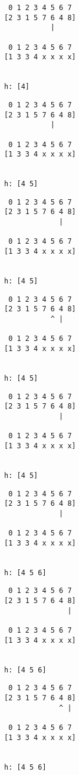{ \begin{verbatim}
 0 1 2 3 4 5 6 7
[2 3 1 5 7 6 4 8]
           |

 0 1 2 3 4 5 6 7
[1 3 3 4 x x x x]


h: [4]
\end{verbatim} }

{ \begin{verbatim}
 0 1 2 3 4 5 6 7
[2 3 1 5 7 6 4 8]
           |

 0 1 2 3 4 5 6 7
[1 3 3 4 x x x x]


h: [4 5]
\end{verbatim} }

{ \begin{verbatim}
 0 1 2 3 4 5 6 7
[2 3 1 5 7 6 4 8]
             |

 0 1 2 3 4 5 6 7
[1 3 3 4 x x x x]


h: [4 5]
\end{verbatim} }

{ \begin{verbatim}
 0 1 2 3 4 5 6 7
[2 3 1 5 7 6 4 8]
           ^ |

 0 1 2 3 4 5 6 7
[1 3 3 4 x x x x]


h: [4 5]
\end{verbatim} }

{ \begin{verbatim}
 0 1 2 3 4 5 6 7
[2 3 1 5 7 6 4 8]
             |

 0 1 2 3 4 5 6 7
[1 3 3 4 x x x x]


h: [4 5]
\end{verbatim} }

{ \begin{verbatim}
 0 1 2 3 4 5 6 7
[2 3 1 5 7 6 4 8]
             |

 0 1 2 3 4 5 6 7
[1 3 3 4 x x x x]


h: [4 5 6]
\end{verbatim} }

{ \begin{verbatim}
 0 1 2 3 4 5 6 7
[2 3 1 5 7 6 4 8]
               |

 0 1 2 3 4 5 6 7
[1 3 3 4 x x x x]


h: [4 5 6]
\end{verbatim} }

{ \begin{verbatim}
 0 1 2 3 4 5 6 7
[2 3 1 5 7 6 4 8]
             ^ |

 0 1 2 3 4 5 6 7
[1 3 3 4 x x x x]


h: [4 5 6]
\end{verbatim} }

